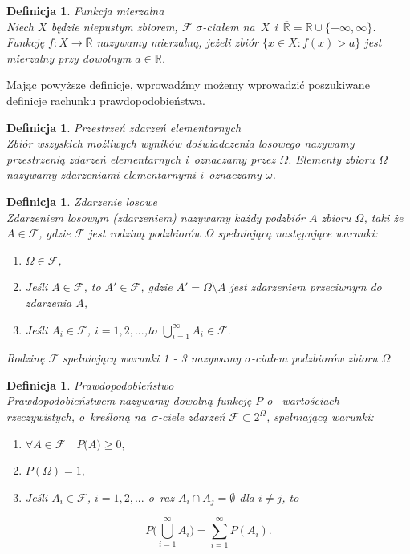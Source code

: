 \documentclass[12pt,a4paper]{report}
\newtheorem{definition}[theorem]{Definicja}
\begin{document}
\begin{definition}{Funkcja mierzalna \cite[w o~parciu o~ rozdział 8.2]{rudnicki2006}}\\
Niech $X$ będzie niepustym zbiorem, $\mathcal{F}$  $\sigma$-ciałem na~$X$ i~$\overline{\mathbb{R}} = \mathbb{R} \cup \{-\infty, \infty \}$. Funkcję $f: X \rightarrow \overline{\mathbb{R}}$ nazywamy mierzalną, jeżeli zbiór $\{ x \in X: f(x) > a \}$ jest mierzalny przy dowolnym $a \in \mathbb{R}$.
\end{definition}

Mając powyższe definicje, wprowadźmy możemy wprowadzić poszukiwane definicje rachunku prawdopodobieństwa. 

\begin{definition}{Przestrzeń zdarzeń elementarnych \cite[w o~parciu o~ rozdział 1.1]{krysicki1999}}\\
Zbiór wszyskich możliwych wyników doświadczenia losowego nazywamy przestrzenią zdarzeń elementarnych i~oznaczamy przez $\Omega$. Elementy zbioru $\Omega$ nazywamy zdarzeniami elementarnymi i~oznaczamy $\omega$.
\end{definition}

\begin{definition}{Zdarzenie losowe \cite[w o~parciu o~ rozdział 1.1]{krysicki1999}}\\
Zdarzeniem losowym (zdarzeniem) nazywamy każdy podzbiór $\textit{A}$ zbioru $\Omega$, taki że  $A \in \mathcal{F}$, gdzie $\mathcal{F}$ jest rodziną podzbiorów $\Omega$ spełniającą następujące warunki:
\begin{enumerate}
\item $\Omega \in \mathcal{F}$,
\item Jeśli $A \in \mathcal{F}$, to $\textit{A$'$} \in \mathcal{F}$, gdzie $\textit{A$'$} = \Omega \setminus A $ jest zdarzeniem przeciwnym do zdarzenia $\textit{A}$,
\item Jeśli $\textit{A}_{i} \in \mathcal{F}$, $i= 1, 2, ...$,to $\bigcup\limits_{i=1}^{\infty} A_{i} \in \mathcal{F}. $
\end{enumerate}
Rodzinę $\mathcal{F}$ spełniającą warunki 1 - 3 nazywamy $\sigma$-ciałem podzbiorów zbioru $\Omega$
\end{definition}


\begin{definition}{Prawdopodobieństwo \cite[w o~parciu o~ rozdział 1.1]{krysicki1999}}\\
Prawdopodobieństwem nazywamy dowolną funkcję $P$ o~ wartościach rzeczywistych, o~kreśloną na~$\sigma$-ciele zdarzeń $\mathcal{F} \subset 2^\Omega$, spełniającą warunki: 
\begin{enumerate}
\item $\forall{\textit{A} \in \mathcal{F}} \quad \textit{P(A)} \geq 0,$
\item $\textit{P}(\Omega) = 1,$
\item Jeśli $\textit{A}_{i} \in \mathcal{F}$, $i= 1, 2, ...$ o~raz $A_{i} \cap A_{j} = \emptyset $ dla $i \neq j$, to 
\end{enumerate}

$$P \Big(\bigcup\limits_{i=1}^{\infty} A_{i} \Big)=\sum_{i=1}^{\infty} P(A_{i}). $$

\end{definition}
\end{document}

